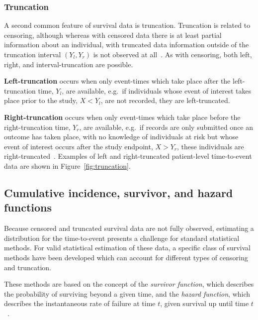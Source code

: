 

\subsubsection{Truncation}

A second common feature of survival data is truncation. Truncation is related to censoring, although whereas with censored data there is at least partial information about an individual, with truncated data information outside of the truncation interval $(Y_l, Y_r)$ is not observed at all~\parencite{Klein2005-ls}. As with censoring, both left, right, and interval-truncation are possible.

\textbf{Left-truncation} occurs when only event-times which take place after the left-truncation time, $Y_l$, are available, e.g.\ if individuals whose event of interest takes place prior to the study, $X < Y_l$, are not recorded, they are left-truncated.

\textbf{Right-truncation} occurs when only event-times which take place before the right-truncation time, $Y_r$, are available, e.g.\ if records are only submitted once an outcome has taken place, with no knowledge of individuals at risk but whose event of interest occurs after the study endpoint, $X > Y_r$, these individuals are right-truncated~\parencite{Klein2005-ls}. Examples of left and right-truncated patient-level time-to-event data are shown in Figure~\ref{fig:truncation}.



\subsection{Cumulative incidence, survivor, and hazard functions}

Because censored and truncated survival data are not fully observed, estimating a distribution for the time-to-event presents a challenge for standard statistical methods. For valid statistical estimation of these data, a specific class of survival methods have been developed which can account for different types of censoring and truncation.

These methods are based on the concept of the \textit{survivor function}, which describes the probability of surviving beyond a given time, and the \textit{hazard function}, which describes the instantaneous rate of failure at time $t$, given survival up until time $t$~\parencite{Collett2023-bg}.

